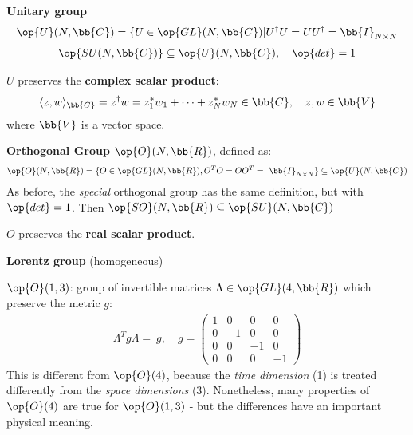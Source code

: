 \documentclass[../Theoretical.tex]{subfiles}
\begin{document}
\begin{dfn}
\textbf{Unitary group}
\begin{align*}
\op{U}(N,\bb{C}) = \{U\in \op{GL}(N,\bb{C}) | U^\dag U = UU^\dag = \bb{I}_{N\times N}
\end{align*}
\begin{align*}
\op{SU(N,\bb{C})} \subseteq \op{U}(N,\bb{C}), \quad \op{det}=1
\end{align*}
\end{dfn}

$U$ preserves the \textbf{complex scalar product}:
\begin{align*}
\langle z, w\rangle_{\bb{C}} = z^\dag w = z_1^* w_1 + \dots + z_N^* w_N \in \bb{C}, \quad z,w\in \bb{V}
\end{align*}
where $\bb{V}$ is a vector space.

\begin{dfn}
\textbf{Orthogonal Group} $\op{O}(N,\bb{R})$, defined as:
\begin{align*}
\op{O}(N,\bb{R}) = \{O \in \op{GL}(N, \bb{R}), O^T O = OO^T =\ \bb{I}_{N\times N}\} \subseteq \op{U}(N,\bb{C})
\end{align*}
As before, the \textit{special} orthogonal group has the same definition, but with $\op{det} = 1$. Then $\op{SO}(N,\bb{R}) \subseteq \op{SU}(N,\bb{C})$
\end{dfn}
$O$ preserves the \textbf{real scalar product}.

\begin{dfn}
\textbf{Lorentz group} (homogeneous)
\item $\op{O}(1,3)$: group of invertible matrices $\Lambda \in \op{GL}(4, \bb{R})$ which preserve the metric $g$:
\begin{align*}
\Lambda^T g \Lambda =\ g, \quad g=\begin{pmatrix}
1 & 0 & 0 & 0\\
0 & -1 & 0 & 0\\
0 & 0 & -1 & 0\\
0 & 0 & 0 & -1
\end{pmatrix}
\end{align*}
This is different from $\op{O}(4)$, because the \textit{time dimension} (1) is treated differently from the \textit{space dimensions} (3). Nonetheless, many properties of $\op{O}(4)$ are true for $\op{O}(1,3)$ - but the differences have an important physical meaning.
\end{dfn}
\end{document}
